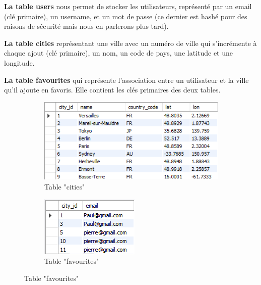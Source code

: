 \documentclass[12pt, french]{article}
\begin{document}
		\textbf{La table users} nous permet de stocker les utilisateurs, représenté par un email (clé primaire), un username, et un mot de passe (ce dernier est hashé pour des raisons de sécurité mais nous en parlerons plus tard).\newline 
		
	    \textbf{La table cities} représentant une ville avec un numéro de ville qui s'incrémente à chaque ajout (clé primaire), un nom, un code de pays, une latitude et une longitude.\newline
	    
		\textbf{La table favourites} qui représente l'association entre un utilisateur et la ville qu'il ajoute en favoris. Elle contient les clés primaires des deux tables.
		
		\begin{figure}[htbp]
		    \centering
    		\begin{subfigure}{.4\textwidth}
                \includegraphics[width=\linewidth]{images/cities.PNG}
                \caption{Table "cities"}    
    		\end{subfigure}
    		\hfill
            \begin{subfigure}{.35\textwidth}
                \includegraphics[width=.8\linewidth]{images/favourites.PNG}
                \caption{Table "favourites"}
            \end{subfigure}

\end{figure}
\end{document}
